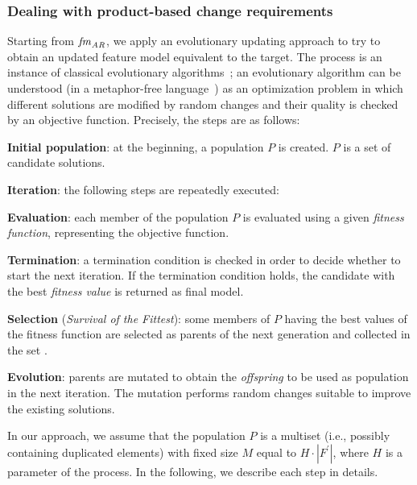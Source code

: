 \begin{tikzborder}{\cite{Gargantini16:validation}}
\begin{tikzborder}{\cite{gargantini_combinatorial_2017}}
\begin{tikzborder}{\cite{gargantini_combinatorial_2017}}
\begin{tikzborder}{\cite{garn2019}}
\begin{tikzborder}{\cite{arcaini2019achieving}}
	\subsubsection{Dealing with product-based change requirements}\label{sec:prodBasedChangeReqs}
	\bb
	Starting from $\mathit{fm}_{\mathit{AR}}$, we apply an evolutionary updating approach to try to obtain an updated feature model equivalent to the target. The process is an instance of classical evolutionary algorithms~\cite{Eiben2003}; an evolutionary algorithm can be understood (in a metaphor-free language~\cite{metaheuristicsMetaphor}) as an optimization problem in which different solutions are modified by random changes and their quality is checked by an objective function. Precisely, the steps are as follows:
	\begin{compactenum}
		\item \textbf{Initial population}: at the beginning, a population $P$ is created. $P$ is a set of candidate solutions.
		\item \textbf{Iteration}: the following steps are repeatedly executed:
		\begin{compactenum}
			\item \textbf{Evaluation}: each member of the population $P$ is evaluated using a given \emph{fitness function}, representing the objective function.
			\item \textbf{Termination}: a termination condition is checked in order to decide whether to start the next iteration. If the termination condition holds, the candidate with the best \emph{fitness value} is returned as final model.
			\item \textbf{Selection} (\emph{Survival of the Fittest}): some members of $P$ having the best values of the fitness function are selected as parents of the next generation and collected in the set \PAR.
			\item \textbf{Evolution}: parents \PAR are mutated to obtain the \emph{offspring} to be used as population in the next iteration. The mutation performs random changes suitable to improve the existing solutions.
		\end{compactenum}
	\end{compactenum}
	
	In our approach, we assume that the population $P$ is a multiset (i.e., possibly containing duplicated elements) with fixed size $M$ equal to $H \cdot |F^\prime|$, where $H$ is a parameter of the process. In the following, we describe each step in details.
	\be
	

\end{tikzborder}
\end{tikzborder}
\end{tikzborder}
\end{tikzborder}
\end{tikzborder}
